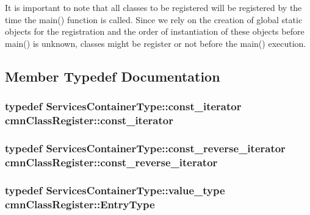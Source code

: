 It is important to note that all classes to be registered will be registered by the time the {\ttfamily main()} function is called. Since we rely on the creation of global static objects for the registration and the order of instantiation of these objects before {\ttfamily main()} is unknown, classes might be register or not before the {\ttfamily main()} execution. 

\subsection{Member Typedef Documentation}
\hypertarget{classcmn_class_register_aacfef62640c83b00064eba6c1f667e26}{}
\subsubsection[{const\+\_\+iterator}]{\setlength{\rightskip}{0pt plus 5cm}typedef Services\+Container\+Type\+::const\+\_\+iterator {\bf cmn\+Class\+Register\+::const\+\_\+iterator}}\label{classcmn_class_register_aacfef62640c83b00064eba6c1f667e26}
\hypertarget{classcmn_class_register_afdce6482c138fc3c4cb611f0ef7c7a08}{}
\subsubsection[{const\+\_\+reverse\+\_\+iterator}]{\setlength{\rightskip}{0pt plus 5cm}typedef Services\+Container\+Type\+::const\+\_\+reverse\+\_\+iterator {\bf cmn\+Class\+Register\+::const\+\_\+reverse\+\_\+iterator}}\label{classcmn_class_register_afdce6482c138fc3c4cb611f0ef7c7a08}
\hypertarget{classcmn_class_register_ac19a6e242b59d7f0336be30be97fabaf}{}
\subsubsection[{Entry\+Type}]{\setlength{\rightskip}{0pt plus 5cm}typedef Services\+Container\+Type\+::value\+\_\+type {\bf cmn\+Class\+Register\+::\+Entry\+Type}}\label{classcmn_class_register_ac19a6e242b59d7f0336be30be97fabaf}
\hypertarget{classcmn_class_register_afad21d7d550eea4f0e0ce5209e7fc437}{}
